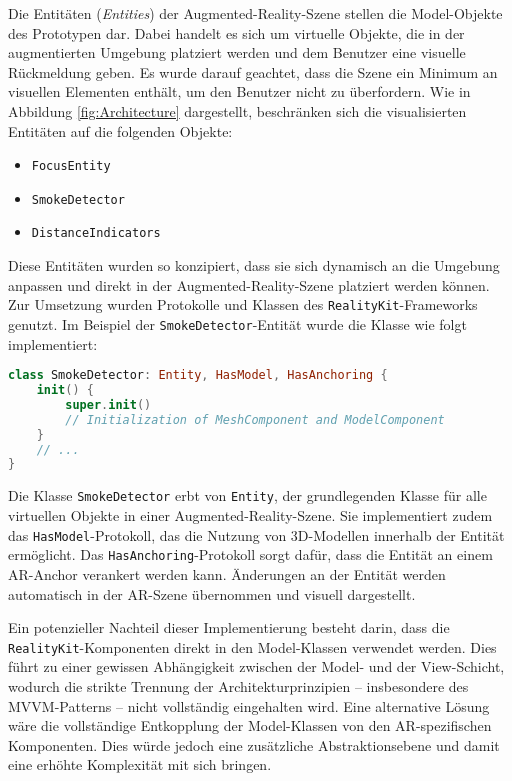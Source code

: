 Die Entitäten (\textit{Entities}) der Augmented-Reality-Szene stellen die Model-Objekte des Prototypen dar. Dabei handelt es sich um virtuelle Objekte, die in der augmentierten Umgebung platziert werden und dem Benutzer eine visuelle Rückmeldung geben. Es wurde darauf geachtet, dass die Szene ein Minimum an visuellen Elementen enthält, um den Benutzer nicht zu überfordern. Wie in Abbildung \ref{fig:Architecture} dargestellt, beschränken sich die visualisierten Entitäten auf die folgenden Objekte:

\begin{itemize}
    \item \texttt{FocusEntity}
    \item \texttt{SmokeDetector}
    \item \texttt{DistanceIndicators}
\end{itemize}

Diese Entitäten wurden so konzipiert, dass sie sich dynamisch an die Umgebung anpassen und direkt in der Augmented-Reality-Szene platziert werden können. Zur Umsetzung wurden Protokolle und Klassen des \texttt{RealityKit}-Frameworks genutzt. Im Beispiel der \texttt{SmokeDetector}-Entität wurde die Klasse wie folgt implementiert:

\begin{lstlisting}[language=Swift]
class SmokeDetector: Entity, HasModel, HasAnchoring {
    init() {
        super.init()
        // Initialization of MeshComponent and ModelComponent
    }
    // ...
}
\end{lstlisting}

Die Klasse \texttt{SmokeDetector} erbt von \texttt{Entity}, der grundlegenden Klasse für alle virtuellen Objekte in einer Augmented-Reality-Szene. Sie implementiert zudem das \texttt{HasModel}-Protokoll, das die Nutzung von 3D-Modellen innerhalb der Entität ermöglicht. Das \texttt{HasAnchoring}-Protokoll sorgt dafür, dass die Entität an einem AR-Anchor verankert werden kann. Änderungen an der Entität werden automatisch in der AR-Szene übernommen und visuell dargestellt.

Ein potenzieller Nachteil dieser Implementierung besteht darin, dass die \texttt{RealityKit}-Komponenten direkt in den Model-Klassen verwendet werden. Dies führt zu einer gewissen Abhängigkeit zwischen der Model- und der View-Schicht, wodurch die strikte Trennung der Architekturprinzipien – insbesondere des MVVM-Patterns – nicht vollständig eingehalten wird. Eine alternative Lösung wäre die vollständige Entkopplung der Model-Klassen von den AR-spezifischen Komponenten. Dies würde jedoch eine zusätzliche Abstraktionsebene und damit eine erhöhte Komplexität mit sich bringen.

